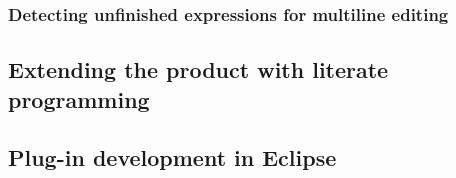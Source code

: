 \subsubsection{Detecting unfinished expressions for multiline editing}
\label{sec:detect-unfin-expr}

\subsection{Extending the product with literate programming}
\label{sec:extend-prod-with}

\subsection{Plug-in development in Eclipse}
\label{ssec:eclipse-plugins}

